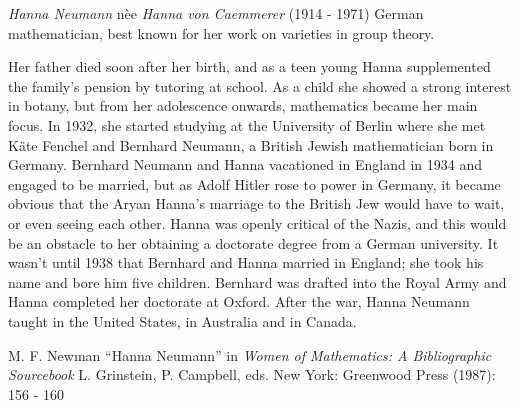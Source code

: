 \documentclass[12pt]{article}
\begin{document}

\emph{Hanna Neumann} n\`ee \emph{Hanna von Caemmerer} (1914 - 1971) German mathematician, best known for her work on varieties in group theory.

Her father died soon after her birth, and as a teen young Hanna supplemented the family's pension by tutoring at school. As a child she showed a strong interest in botany, but from her adolescence onwards, mathematics became her main focus. In 1932, she started studying at the University of Berlin where she met K\"ate Fenchel and Bernhard Neumann, a British Jewish mathematician born in Germany. Bernhard Neumann and Hanna vacationed in England in 1934 and engaged to be married, but as Adolf Hitler rose to power in Germany, it became obvious that the Aryan Hanna's marriage to the British Jew would have to wait, or even seeing each other. Hanna was openly critical of the Nazis, and this would be an obstacle to her obtaining a doctorate degree from a German university. It wasn't until 1938 that Bernhard and Hanna married in England; she took his name and bore him five children. Bernhard was drafted into the Royal Army and Hanna completed her doctorate at Oxford. After the war, Hanna Neumann taught in the United States, in Australia and in Canada.

\begin{thebibliography}{5}
 M. F. Newman ``Hanna Neumann'' in {\it Women of Mathematics: A Bibliographic Sourcebook} L. Grinstein, P. Campbell, eds. New York: Greenwood Press (1987): 156 - 160
\end{thebibliography}
\end{document}
